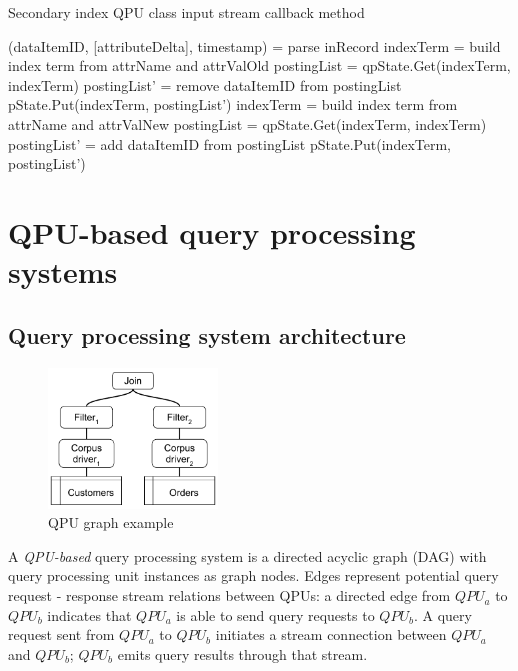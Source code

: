 \begin{algorithm}
\caption{Secondary index QPU class input stream callback method}
\label{algo:index_callback_func}
\begin{algorithmic}
\State (dataItemID, [attributeDelta], timestamp) = parse inRecord
\State indexTerm = build index term from attrName and attrValOld
\State postingList = qpState.Get(indexTerm, indexTerm)
\State postingList' = remove dataItemID from postingList
\State pState.Put(indexTerm, postingList')
\EndIf
{}
\State indexTerm = build index term from attrName and attrValNew
\State postingList = qpState.Get(indexTerm, indexTerm)
\State postingList' = add dataItemID from postingList
\State pState.Put(indexTerm, postingList')
\EndIf
\EndFor
\EndFunction
\end{algorithmic}
\end{algorithm}


\section{QPU-based query processing systems}
\label{sec:query_processing_system}

\subsection{Query processing system architecture}

\begin{figure}[t]
  \centering
    \includegraphics[width=0.4\textwidth]{./figures/design_pattern/qpu_graph_emergent_properties.pdf}
  \caption{QPU graph example}
  \label{fig:qpu_graph_emergent_properties}
\end{figure}

A \textit{QPU-based} query processing system is a directed acyclic graph (DAG) with query processing unit instances as
graph nodes.
Edges represent potential query request - response stream relations between QPUs:
a directed edge from $QPU_a$ to $QPU_b$ indicates that $QPU_a$ is able to send query requests to $QPU_b$.
A query request sent from $QPU_a$ to $QPU_b$ initiates a stream connection between $QPU_a$ and $QPU_b$;
$QPU_b$ emits query results through that stream.

